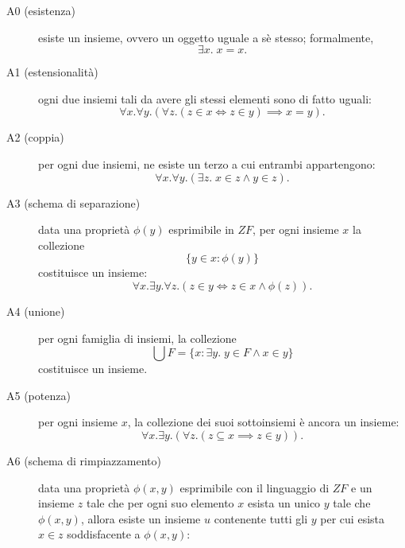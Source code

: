 \begin{description}
  \item[A0 (esistenza)] esiste un insieme, ovvero un oggetto uguale a sè stesso; formalmente,
  \begin{equation}
    \exists{}x. \; x = x.
  \end{equation}
  \item[A1 (estensionalità)] ogni due insiemi tali da avere gli stessi elementi sono di fatto uguali:
  \begin{equation}
    \forall x. \forall y. \left(\forall z.\left(z \in x \iff z \in y \right) \implies x = y \right).
  \end{equation}
  \item[A2 (coppia)] per ogni due insiemi, ne esiste un terzo a cui entrambi appartengono:
  \begin{equation}
    \forall x. \forall y. \left(\exists z. \; x \in z \land y \in z \right).
  \end{equation}
  \item[A3 (schema di separazione)] data una proprietà \(\phi(y)\) esprimibile in \(ZF\), per ogni insieme \(x\) la collezione
  \begin{equation}
    \lbrace y \in x \colon \phi(y) \rbrace
  \end{equation}
  costituisce un insieme:
  \begin{equation}
    \forall x. \exists y. \forall z. \left(z \in y \iff z \in x \land \phi(z)\right).
  \end{equation}
  \item[A4 (unione)] per ogni famiglia di insiemi, la collezione
  \begin{equation}
    \bigcup F = \lbrace x \colon \exists y. \; y \in F \land x \in y \rbrace
  \end{equation}
  costituisce un insieme.
  \item[A5 (potenza)] per ogni insieme \(x\), la collezione dei suoi sottoinsiemi è ancora un insieme:
  \begin{equation}
    \forall x. \exists y. \left(\forall z. (z \subseteq x \implies z \in y)\right).
  \end{equation}
  \item[A6 (schema di rimpiazzamento)] data una proprietà \(\phi(x,y)\) esprimibile con il linguaggio di \(ZF\) e un insieme \(z\) tale che per ogni suo elemento \(x\) esista un unico \(y\) tale che \(\phi(x,y)\), allora esiste un insieme \(u\) contenente tutti gli \(y\) per cui esista \(x \in z\) soddisfacente a \(\phi(x,y)\):

\end{description}
